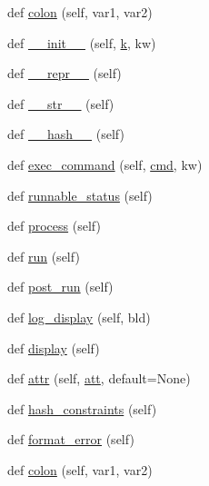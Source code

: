 \begin{DoxyCompactItemize}
def \hyperlink{classwaflib_1_1_task_1_1_task_base_ae9648ec691e059291a79f38ef6ee12cc}{colon} (self, var1, var2)
\item 
def \hyperlink{classwaflib_1_1_task_1_1_task_base_add6ae927b00bd1f14d5b87738dd53e70}{\+\_\+\+\_\+init\+\_\+\+\_\+} (self, \hyperlink{rfft2d_test_m_l_8m_adc468c70fb574ebd07287b38d0d0676d}{k}, kw)
\item 
def \hyperlink{classwaflib_1_1_task_1_1_task_base_a004a67fbb5d7e36d1a6ba48390e0d5f7}{\+\_\+\+\_\+repr\+\_\+\+\_\+} (self)
\item 
def \hyperlink{classwaflib_1_1_task_1_1_task_base_a07123f80c95b1d17a699064cd10d8885}{\+\_\+\+\_\+str\+\_\+\+\_\+} (self)
\item 
def \hyperlink{classwaflib_1_1_task_1_1_task_base_a5e02f89716bcd37b2490adc0861c4bdd}{\+\_\+\+\_\+hash\+\_\+\+\_\+} (self)
\item 
def \hyperlink{classwaflib_1_1_task_1_1_task_base_a6326ff82d67a2b629c8d78b95cb8fec6}{exec\+\_\+command} (self, \hyperlink{sndfile__play_8m_adfc5ba7e22f5e4a6221c12a70503bef3}{cmd}, kw)
\item 
def \hyperlink{classwaflib_1_1_task_1_1_task_base_a10c4597d9085bd1680f9b3eb28e23899}{runnable\+\_\+status} (self)
\item 
def \hyperlink{classwaflib_1_1_task_1_1_task_base_ae5e951a187c8d09c31960bbcf76fad25}{process} (self)
\item 
def \hyperlink{classwaflib_1_1_task_1_1_task_base_ae549bc1a80fd94cc94fd1e764c76895c}{run} (self)
\item 
def \hyperlink{classwaflib_1_1_task_1_1_task_base_a21b09d3f18df76e1d8b0719f321ea3bd}{post\+\_\+run} (self)
\item 
def \hyperlink{classwaflib_1_1_task_1_1_task_base_adf380fd031fc987f4dcd54e1f70420a7}{log\+\_\+display} (self, bld)
\item 
def \hyperlink{classwaflib_1_1_task_1_1_task_base_a838316cf55ac50fab2ae0e8771917e74}{display} (self)
\item 
def \hyperlink{classwaflib_1_1_task_1_1_task_base_a8ead2ec09545f4e9e27d6b40f9f80eaa}{attr} (self, \hyperlink{filters_8h_a6cbe32dd86cefd1a8b182b3ee652e9bf}{att}, default=None)
\item 
def \hyperlink{classwaflib_1_1_task_1_1_task_base_ad4f2583a59ff62565735490154826033}{hash\+\_\+constraints} (self)
\item 
def \hyperlink{classwaflib_1_1_task_1_1_task_base_a321e667402035aa56626ee6f7b3b8223}{format\+\_\+error} (self)
\item 
def \hyperlink{classwaflib_1_1_task_1_1_task_base_ae9648ec691e059291a79f38ef6ee12cc}{colon} (self, var1, var2)

\end{DoxyCompactItemize}
